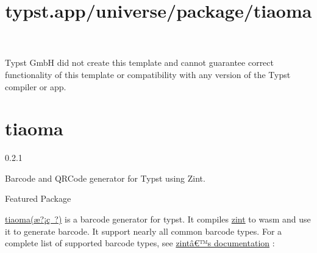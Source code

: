 Typst GmbH did not create this template and cannot guarantee correct
functionality of this template or compatibility with any version of the
Typst compiler or app.


\title{typst.app/universe/package/tiaoma}

\label{banner}
\section{tiaoma}\label{tiaoma}

{ 0.2.1 }

Barcode and QRCode generator for Typst using Zint.

{ } Featured Package

\label{readme}
\href{https://github.com/enter-tainer/zint-wasi}{tiaoma(æ?¡ç~?)} is a
barcode generator for typst. It compiles
\href{https://github.com/zint/zint}{zint} to wasm and use it to generate
barcode. It support nearly all common barcode types. For a complete list
of supported barcode types, see \href{https://zint.org.uk/}{zintâ€™s
documentation} :

